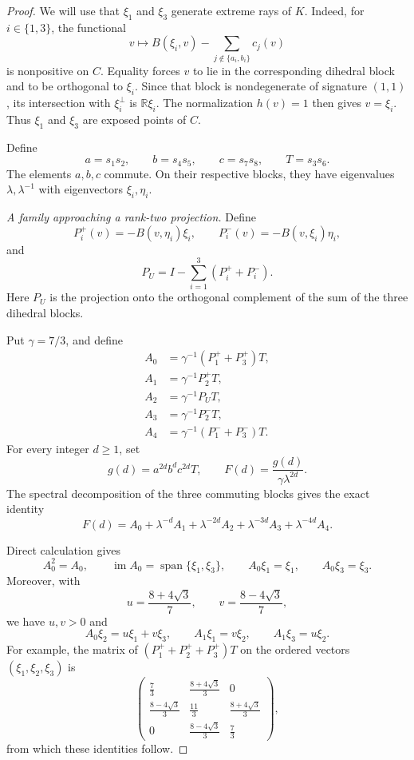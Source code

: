 \documentclass[11pt,reqno]{amsart}
\theoremstyle{plain}
\theoremstyle{definition}
\theoremstyle{remark}
\numberwithin{equation}{section}
\begin{document}
\begin{proof}
We will use that $\xi_1$ and $\xi_3$ generate extreme rays of $K$.
Indeed, for $i\in\{1,3\}$, the functional
\[
v\longmapsto
B(\xi_i,v)-\sum_{j\notin\{a_i,b_i\}}c_j(v)
\]
is nonpositive on $C$.
Equality forces $v$ to lie in the corresponding dihedral block
and to be orthogonal to $\xi_i$.
Since that block is nondegenerate of signature $(1,1)$,
its intersection with $\xi_i^\perp$ is $\mathbb R\xi_i$.
The normalization $h(v)=1$ then gives $v=\xi_i$.
Thus $\xi_1$ and $\xi_3$ are exposed points of $C$.

Define
\[
a=s_1s_2,
\qquad
b=s_4s_5,
\qquad
c=s_7s_8,
\qquad
T=s_3s_6.
\]
The elements $a,b,c$ commute. On their respective blocks,
they have eigenvalues $\lambda,\lambda^{-1}$ with
eigenvectors $\xi_i,\eta_i$.

\medskip
\noindent\textit{A family approaching a rank-two projection.}
Define
\[
P_i^+(v)=-B(v,\eta_i)\xi_i,
\qquad
P_i^-(v)=-B(v,\xi_i)\eta_i,
\]
and
\[
P_U=I-\sum_{i=1}^{3}(P_i^++P_i^-).
\]
Here $P_U$ is the projection onto the orthogonal complement of
the sum of the three dihedral blocks.

Put $\gamma=7/3$, and define
\[
\begin{aligned}
A_0&=\gamma^{-1}(P_1^++P_3^+)T,\\
A_1&=\gamma^{-1}P_2^+T,\\
A_2&=\gamma^{-1}P_UT,\\
A_3&=\gamma^{-1}P_2^-T,\\
A_4&=\gamma^{-1}(P_1^-+P_3^-)T.
\end{aligned}
\]
For every integer $d\ge1$, set
\[
g(d)=a^{2d}b^dc^{2d}T,
\qquad
F(d)=\frac{g(d)}{\gamma\lambda^{2d}}.
\]
The spectral decomposition of the three commuting blocks gives
the exact identity
\begin{equation}\label{eq:nonexposed-factor-expansion}
F(d)=
A_0+\lambda^{-d}A_1+\lambda^{-2d}A_2
+\lambda^{-3d}A_3+\lambda^{-4d}A_4.
\end{equation}

Direct calculation gives
\begin{equation}\label{eq:nonexposed-projection}
A_0^2=A_0,
\qquad
\operatorname{im}A_0=\operatorname{span}\{\xi_1,\xi_3\},
\qquad
A_0\xi_1=\xi_1,
\qquad
A_0\xi_3=\xi_3.
\end{equation}
Moreover, with
\[
u=\frac{8+4\sqrt3}{7},
\qquad
v=\frac{8-4\sqrt3}{7},
\]
we have $u,v>0$ and
\begin{equation}\label{eq:nonexposed-transitions}
A_0\xi_2=u\xi_1+v\xi_3,
\qquad
A_1\xi_1=v\xi_2,
\qquad
A_1\xi_3=u\xi_2.
\end{equation}
For example, the matrix of $(P_1^++P_2^++P_3^+)T$
on the ordered vectors $(\xi_1,\xi_2,\xi_3)$ is
\[
\begin{pmatrix}
\frac73&\frac{8+4\sqrt3}{3}&0\\
\frac{8-4\sqrt3}{3}&\frac{11}{3}&\frac{8+4\sqrt3}{3}\\
0&\frac{8-4\sqrt3}{3}&\frac73
\end{pmatrix},
\]
from which these identities follow.


\end{proof}
\end{document}
